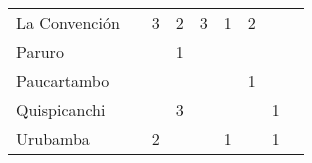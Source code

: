 \begin{tabular}{lcccccccc}
	La Convención &                          & 3                        & 2                        & 3                        & 1                        & 2                        & \cellcolor[HTML]{FCC46C} & \cellcolor[HTML]{FCC46C} \\
	Paruro        & \cellcolor[HTML]{FCC46C} & \cellcolor[HTML]{FCC46C} & 1                        & \cellcolor[HTML]{FCC46C} & \cellcolor[HTML]{FCC46C} & \cellcolor[HTML]{FCC46C} & \cellcolor[HTML]{FCC46C} & \cellcolor[HTML]{FCC46C} \\
	Paucartambo   & \cellcolor[HTML]{FCC46C} & \cellcolor[HTML]{FCC46C} & \cellcolor[HTML]{FCC46C} & \cellcolor[HTML]{FCC46C} & \cellcolor[HTML]{FCC46C} & 1                        & \cellcolor[HTML]{FCC46C} & \cellcolor[HTML]{FCC46C} \\
	Quispicanchi  & \cellcolor[HTML]{FCC46C} & \cellcolor[HTML]{FCC46C} & 3                        & \cellcolor[HTML]{FCC46C} & \cellcolor[HTML]{FCC46C} & \cellcolor[HTML]{FCC46C} & 1                        & \cellcolor[HTML]{FCC46C} \\
	Urubamba      & \cellcolor[HTML]{FCC46C} & 2                        & \cellcolor[HTML]{FCC46C} & \cellcolor[HTML]{FCC46C} & 1                        & \cellcolor[HTML]{FCC46C} & 1                        & \cellcolor[HTML]{FCC46C}
\end{tabular}